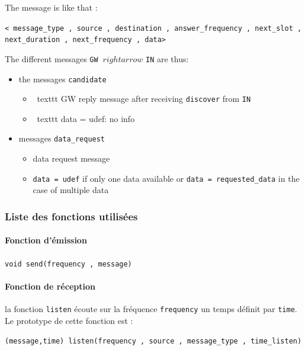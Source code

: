 \documentclass[conference]{IEEEtran}
\begin{document}
The message is like that   :

\begin{center}
\texttt{< message\_type , source , destination , answer\_frequency , next\_slot , next\_duration , next\_frequency , data>}
\end{center}

The different messages \texttt {GW} $ \ rightarrow $ \texttt {IN} are thus:
\begin{itemize}
     \item the messages \texttt {candidate} 
     \begin {itemize}
       \item \ texttt {GW} reply message after receiving \texttt{discover} from \texttt{IN}
       \item \ texttt {data = udef}: no info
     \end{itemize}
     \item messages \texttt{data\_request}
     \begin{itemize}
       \item data request message
       \item \texttt{data = udef} if only one data available or \texttt{data = requested\_data} in the case of multiple data
     \end{itemize}
\end {itemize}

\subsubsection{Liste des fonctions utilisées}

\paragraph{Fonction d'émission}

\texttt{void send(frequency , message)}

\paragraph{Fonction de réception}

la fonction \texttt{listen} écoute sur la fréquence \texttt{frequency} un temps définit par \texttt{time}. Le prototype de cette fonction est :

\begin{center}
\texttt{(message,time) listen(frequency , source , message\_type , time\_listen)}
\end{center}
\end{document}
